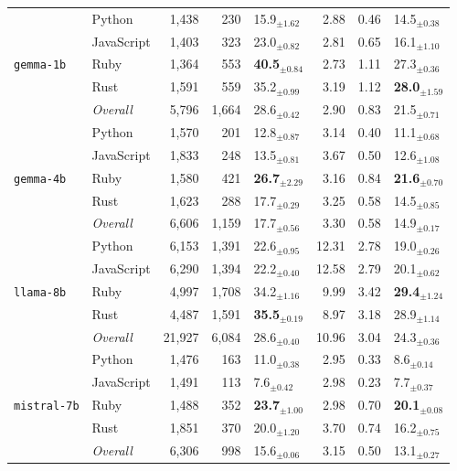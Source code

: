 \begin{longtable}{@{}llrrp{0.72cm}rrp{0.72cm}@{}}
      \multirow{5}{*}{\texttt{gemma-1b}} & Python & 1,438 & 230 & 15.9$_{\pm 1.62}$ & 2.88 & 0.46 & 14.5$_{\pm 0.38}$ \\
       & JavaScript & 1,403 & 323 & 23.0$_{\pm 0.82}$ & 2.81 & 0.65 & 16.1$_{\pm 1.10}$ \\
       & Ruby & 1,364 & 553 & \textbf{40.5$_{\pm 0.84}$} & 2.73 & 1.11 & 27.3$_{\pm 0.36}$ \\
       & Rust & 1,591 & 559 & 35.2$_{\pm 0.99}$ & 3.19 & 1.12 & \textbf{28.0$_{\pm 1.59}$} \\ \cmidrule(lr){2-8}
      & \textit{Overall} & 5,796 & 1,664 & 28.6$_{\pm 0.42}$ & 2.90 & 0.83 & 21.5$_{\pm 0.71}$ \\
    \midrule

      \multirow{5}{*}{\texttt{gemma-4b}} & Python & 1,570 & 201 & 12.8$_{\pm 0.87}$ & 3.14 & 0.40 & 11.1$_{\pm 0.68}$ \\
       & JavaScript & 1,833 & 248 & 13.5$_{\pm 0.81}$ & 3.67 & 0.50 & 12.6$_{\pm 1.08}$ \\
       & Ruby & 1,580 & 421 & \textbf{26.7$_{\pm 2.29}$} & 3.16 & 0.84 & \textbf{21.6$_{\pm 0.70}$} \\
       & Rust & 1,623 & 288 & 17.7$_{\pm 0.29}$ & 3.25 & 0.58 & 14.5$_{\pm 0.85}$ \\ \cmidrule(lr){2-8}
      & \textit{Overall} & 6,606 & 1,159 & 17.7$_{\pm 0.56}$ & 3.30 & 0.58 & 14.9$_{\pm 0.17}$ \\
    \midrule

      \multirow{5}{*}{\texttt{llama-8b}} & Python & 6,153 & 1,391 & 22.6$_{\pm 0.95}$ & 12.31 & 2.78 & 19.0$_{\pm 0.26}$ \\
       & JavaScript & 6,290 & 1,394 & 22.2$_{\pm 0.40}$ & 12.58 & 2.79 & 20.1$_{\pm 0.62}$ \\
       & Ruby & 4,997 & 1,708 & 34.2$_{\pm 1.16}$ & 9.99 & 3.42 & \textbf{29.4$_{\pm 1.24}$} \\
       & Rust & 4,487 & 1,591 & \textbf{35.5$_{\pm 0.19}$} & 8.97 & 3.18 & 28.9$_{\pm 1.14}$ \\ \cmidrule(lr){2-8}
      & \textit{Overall} & 21,927 & 6,084 & 28.6$_{\pm 0.40}$ & 10.96 & 3.04 & 24.3$_{\pm 0.36}$ \\
    \midrule

      \multirow{5}{*}{\texttt{mistral-7b}} & Python & 1,476 & 163 & 11.0$_{\pm 0.38}$ & 2.95 & 0.33 & 8.6$_{\pm 0.14}$ \\
       & JavaScript & 1,491 & 113 & 7.6$_{\pm 0.42}$ & 2.98 & 0.23 & 7.7$_{\pm 0.37}$ \\
       & Ruby & 1,488 & 352 & \textbf{23.7$_{\pm 1.00}$} & 2.98 & 0.70 & \textbf{20.1$_{\pm 0.08}$} \\
       & Rust & 1,851 & 370 & 20.0$_{\pm 1.20}$ & 3.70 & 0.74 & 16.2$_{\pm 0.75}$ \\ \cmidrule(lr){2-8}
      & \textit{Overall} & 6,306 & 998 & 15.6$_{\pm 0.06}$ & 3.15 & 0.50 & 13.1$_{\pm 0.27}$ \\
    \midrule


\end{longtable}
